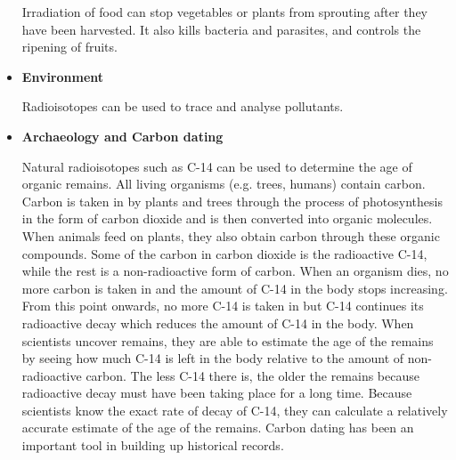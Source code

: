 \begin{itemize}
Irradiation of food can stop vegetables or plants from sprouting after they have been harvested. It also kills bacteria and parasites, and controls the ripening of fruits.

\item{\textbf{Environment}}

Radioisotopes can be used to trace and analyse pollutants.

\item{\textbf{Archaeology and Carbon dating}}

Natural radioisotopes such as C-14 can be used to determine the age of organic remains. All living organisms (e.g.\@{} trees, humans) contain carbon. Carbon is taken in by plants and trees through the process of photosynthesis in the form of carbon dioxide and is then converted into organic molecules. When animals feed on plants, they also obtain carbon through these organic compounds. Some of the carbon in carbon dioxide is the radioactive C-14, while the rest is a non-radioactive form of carbon. When an organism dies, no more carbon is taken in and the amount of C-14 in the body stops increasing. From this point onwards, no more C-14 is taken in but C-14 continues its radioactive decay which reduces the amount of C-14 in the body. When scientists uncover remains, they are able to estimate the age of the remains by seeing how much C-14 is left in the body relative to the amount of non-radioactive carbon. The less C-14 there is, the older the remains because radioactive decay must have been taking place for a long time. Because scientists know the exact rate of decay of C-14, they can calculate a relatively accurate estimate of the age of the remains. Carbon dating has been an important tool in building up historical records.

\end{itemize}

